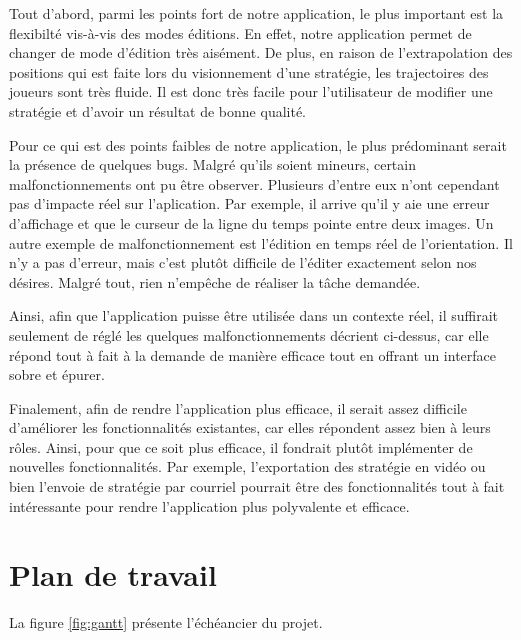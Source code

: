 \documentclass[ULlof]{ULrapport}
\begin{document}
Tout d'abord, parmi les points fort de notre application, le plus important est la flexibilté vis-à-vis des modes éditions. En effet, notre application permet de changer de mode d'édition très aisément. De plus, en raison de l'extrapolation des positions qui est faite lors du visionnement d'une stratégie, les trajectoires des joueurs sont très fluide. Il est donc très facile pour l'utilisateur de modifier une stratégie et d'avoir un résultat de bonne qualité.

Pour ce qui est des points faibles de notre application, le plus prédominant serait la présence de quelques bugs. Malgré qu'ils soient mineurs, certain malfonctionnements ont pu être observer. Plusieurs d'entre eux n'ont cependant pas d'impacte réel sur l'aplication. Par exemple, il arrive qu'il y aie une erreur d'affichage et que le curseur de la ligne du temps pointe entre deux images. Un autre exemple de malfonctionnement est l'édition en temps réel de l'orientation. Il n'y a pas d'erreur, mais c'est plutôt difficile de l'éditer exactement selon nos désires. Malgré tout, rien n'empêche de réaliser la tâche demandée.

Ainsi, afin que l'application puisse être utilisée dans un contexte réel, il suffirait seulement de réglé les quelques malfonctionnements décrient ci-dessus, car elle répond tout à fait à la demande de manière efficace tout en offrant un interface sobre et épurer.

Finalement, afin de rendre l'application plus efficace, il serait assez difficile d'améliorer les fonctionnalités existantes, car elles répondent assez bien à leurs rôles. Ainsi, pour que ce soit plus efficace, il fondrait plutôt implémenter de nouvelles fonctionnalités. Par exemple, l'exportation des stratégie en vidéo ou bien l'envoie de stratégie par courriel pourrait être des fonctionnalités tout à fait intéressante pour rendre l'application plus polyvalente et efficace.

\chapter{Plan de travail}

La figure \ref{fig:gantt} présente l'échéancier du projet.
\end{document}
